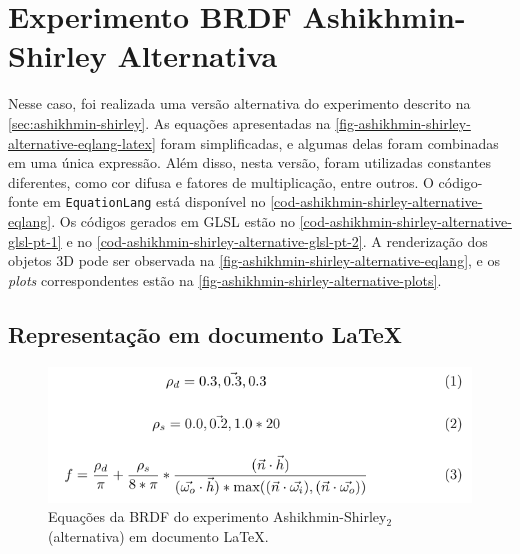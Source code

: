 
\section{Experimento BRDF Ashikhmin-Shirley Alternativa}


Nesse caso, foi realizada uma versão alternativa do experimento descrito na \autoref{sec:ashikhmin-shirley}. As equações apresentadas na \autoref{fig-ashikhmin-shirley-alternative-eqlang-latex} foram simplificadas, e algumas delas foram combinadas em uma única expressão. Além disso, nesta versão, foram utilizadas constantes diferentes, como cor difusa e fatores de multiplicação, entre outros. O código-fonte em \texttt{EquationLang} está disponível no \autoref{cod-ashikhmin-shirley-alternative-eqlang}. Os códigos gerados em GLSL estão no \autoref{cod-ashikhmin-shirley-alternative-glsl-pt-1} e no \autoref{cod-ashikhmin-shirley-alternative-glsl-pt-2}. A renderização dos objetos 3D pode ser observada na \autoref{fig-ashikhmin-shirley-alternative-eqlang}, e os \textit{plots} correspondentes estão na \autoref{fig-ashikhmin-shirley-alternative-plots}.
\subsection{Representação em documento \LaTeX{}}
\begin{figure}[H]
  \caption{\label{fig-ashikhmin-shirley-alternative-eqlang-latex}
  \small Equações da BRDF do experimento Ashikhmin-Shirley$_2$ (alternativa) em documento \LaTeX{}.}
    \begin{center}
        \includegraphics[scale=0.92]{./Imagens/brdfs/ashikhmin-shirley-alternative.pdf}
    \end{center}
\end{figure}

